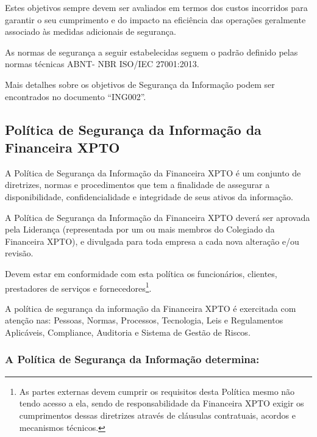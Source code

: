 \documentclass[a4paper,12pt]{article}
\begin{document}
Estes objetivos sempre devem ser avaliados em termos dos custos incorridos para garantir o seu cumprimento e do impacto na eficiência das operações geralmente associado às medidas adicionais de segurança.

As normas de segurança a seguir estabelecidas seguem o padrão definido pelas normas técnicas ABNT- NBR ISO/IEC 27001:2013.

Mais detalhes sobre os objetivos de Segurança da Informação podem ser encontrados no documento “ING002”.

\subsection{Política de Segurança da Informação da Financeira XPTO}

A Política de Segurança da Informação da Financeira XPTO é um conjunto de diretrizes, normas e procedimentos que tem a finalidade de assegurar a disponibilidade, confidencialidade e integridade de seus ativos da informação.

A Política de Segurança da Informação da Financeira XPTO deverá ser aprovada pela Liderança (representada por um ou mais membros do Colegiado da Financeira XPTO), e divulgada para toda empresa a cada nova alteração e/ou revisão. 

Devem estar em conformidade com esta política os funcionários, clientes, prestadores de serviços e fornecedores\footnote{As partes externas devem cumprir os requisitos desta Política mesmo não tendo acesso a ela, sendo de responsabilidade da Financeira XPTO exigir os cumprimentos dessas diretrizes através de cláusulas contratuais, acordos e mecanismos técnicos.}.

A política de segurança da informação da Financeira XPTO é exercitada com atenção nas: Pessoas, Normas, Processos, Tecnologia, Leis e Regulamentos Aplicáveis, Compliance, Auditoria e Sistema de Gestão de Riscos.

\subsubsection{A Política de Segurança da Informação determina:}
\end{document}
